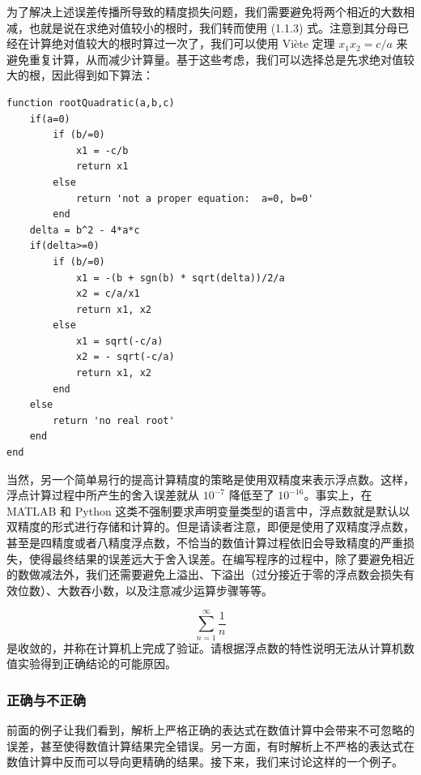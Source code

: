 为了解决上述误差传播所导致的精度损失问题，我们需要避免将两个相近的大数相减，也就是说在求绝对值较小的根时，我们转而使用 (1.1.3) 式。注意到其分母已经在计算绝对值较大的根时算过一次了，我们可以使用 Viète 定理 $x_1x_2=c/a$ 来避免重复计算，从而减少计算量。基于这些考虑，我们可以选择总是先求绝对值较大的根，因此得到如下算法：

\begin{algorithmBox}
\begin{lstlisting}[style=bellacode]
function rootQuadratic(a,b,c)
    if(a=0)
        if (b/=0)
            x1 = -c/b
            return x1
        else
            return 'not a proper equation:  a=0, b=0'
        end
    delta = b^2 - 4*a*c
    if(delta>=0)
        if (b/=0)
            x1 = -(b + sgn(b) * sqrt(delta))/2/a
            x2 = c/a/x1
            return x1, x2
        else
            x1 = sqrt(-c/a)
            x2 = - sqrt(-c/a)
            return x1, x2
        end
    else
        return 'no real root'
    end
end
\end{lstlisting}
\end{algorithmBox}

当然，另一个简单易行的提高计算精度的策略是使用双精度来表示浮点数。这样，浮点计算过程中所产生的舍入误差就从 $10^{-7}$ 降低至了 $10^{-16}$。事实上，在 MATLAB 和 Python 这类不强制要求声明变量类型的语言中，浮点数就是默认以双精度的形式进行存储和计算的。但是请读者注意，即便是使用了双精度浮点数，甚至是四精度或者八精度浮点数，不恰当的数值计算过程依旧会导致精度的严重损失，使得最终结果的误差远大于舍入误差。在编写程序的过程中，除了要避免相近的数做减法外，我们还需要避免上溢出、下溢出（过分接近于零的浮点数会损失有效位数）、大数吞小数，以及注意减少运算步骤等等。

\begin{exerciseBox}
\[
\sum_{n=1}^{\infty}\frac{1}{n}
\]
是收敛的，并称在计算机上完成了验证。请根据浮点数的特性说明无法从计算机数值实验得到正确结论的可能原因。
\end{exerciseBox}

\subsubsection{正确与不正确}

前面的例子让我们看到，解析上严格正确的表达式在数值计算中会带来不可忽略的误差，甚至使得数值计算结果完全错误。另一方面，有时解析上不严格的表达式在数值计算中反而可以导向更精确的结果。接下来，我们来讨论这样的一个例子。

